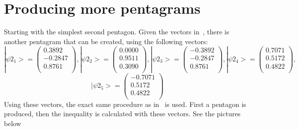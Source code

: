 \documentclass[
  utf8,%
  parskip,%
  largesmallcaps,intlimits,widermath,%
  sharecounter,nobreak,definition=marks,%
  noparts%
]{rtthesis}
\begin{document}
\section{Producing more pentagrams}\label{sec:Producing more pentagrams}
Starting with the simplest second pentagon. Given the vectors in~, there is another pentagram that can be created, using the following vectors:
\begin{equation*}
|\psi2_1>=
\begin{pmatrix}
0.3892\\
-0.2847\\
0.8761\\
\end{pmatrix}
,
|\psi2_2>=
\begin{pmatrix}
0.0000\\
0.9511\\
0.3090\\
\end{pmatrix}
,
|\psi2_3>=
\begin{pmatrix}
-0.3892\\
-0.2847\\
0.8761\\
\end{pmatrix}
,
|\psi2_4>=
\begin{pmatrix}
0.7071\\
0.5172\\
0.4822\\
\end{pmatrix}
,
\end{equation*}
\begin{equation*}
|\psi2_5>=
\begin{pmatrix}
-0.7071\\
0.5172\\
0.4822\\
\end{pmatrix}
\end{equation*}
Using these vectors, the exact same procedure as in~ is used. First a pentagon is produced, then the inequality is calculated with these vectors. See the pictures below 
\end{document}
